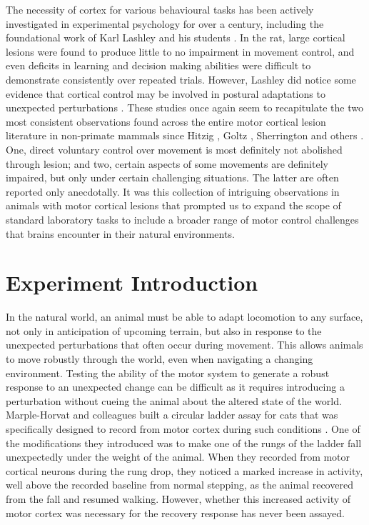 The necessity of cortex for various behavioural tasks has been actively investigated in experimental psychology for over a century, including the foundational work of Karl Lashley and his students \citep{Lashley1921a,Lashley1950a}. In the rat, large cortical lesions were found to produce little to no impairment in movement control, and even deficits in learning and decision making abilities were difficult to demonstrate consistently over repeated trials. However, Lashley did notice some evidence that cortical control may be involved in postural adaptations to unexpected perturbations \citep{Lashley1921a}. These studies once again seem to recapitulate the two most consistent observations found across the entire motor cortical lesion literature in non-primate mammals since Hitzig \citep{Fritsch1870}, Goltz \citep{Goltz1888}, Sherrington \citep{Sherrington1885} and others \citep{Oakley1979,Terry1989}. One, direct voluntary control over movement is most definitely not abolished through lesion; and two, certain aspects of some movements are definitely impaired, but only under certain challenging situations. The latter are often reported only anecdotally. It was this collection of intriguing observations in animals with motor cortical lesions that prompted us to expand the scope of standard laboratory tasks to include a broader range of motor control challenges that brains encounter in their natural environments.

\section{Experiment Introduction}

In the natural world, an animal must be able to adapt locomotion to any surface, not only in anticipation of upcoming terrain, but also in response to the unexpected perturbations that often occur during movement. This allows animals to move robustly through the world, even when navigating a changing environment. Testing the ability of the motor system to generate a robust response to an unexpected change can be difficult as it requires introducing a perturbation without cueing the animal about the altered state of the world. Marple-Horvat and colleagues built a circular ladder assay for cats that was specifically designed to record from motor cortex during such conditions \citep{Marple-Horvat1993}. One of the modifications they introduced was to make one of the rungs of the ladder fall unexpectedly under the weight of the animal. When they recorded from motor cortical neurons during the rung drop, they noticed a marked increase in activity, well above the recorded baseline from normal stepping, as the animal recovered from the fall and resumed walking. However, whether this increased activity of motor cortex was necessary for the recovery response has never been assayed.

